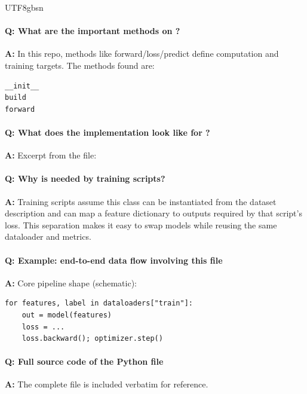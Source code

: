 \documentclass[11pt]{article}
\begin{document}
\begin{CJK*}{UTF8}{gbsn}
\paragraph{Q: What are the important methods on \texttt{}?}
\textbf{A:} In this repo, methods like forward/loss/predict define computation and training targets. The methods found are:

\begin{Verbatim}[fontsize=\small]
__init__
build
forward
\end{Verbatim}

\paragraph{Q: What does the implementation look like for \texttt{}?}
\textbf{A:} Excerpt from the file:

\vspace{1mm}


\paragraph{Q: Why is \texttt{} needed by training scripts?}
\textbf{A:} Training scripts assume this class can be instantiated from the dataset description and can map a feature dictionary to outputs required by that script's loss. This separation makes it easy to swap models while reusing the same dataloader and metrics.

\paragraph{Q: Example: end-to-end data flow involving this file}
\textbf{A:} Core pipeline shape (schematic):

\begin{Verbatim}[fontsize=\small]
for features, label in dataloaders["train"]:
    out = model(features)
    loss = ...
    loss.backward(); optimizer.step()
\end{Verbatim}

\paragraph{Q: Full source code of the Python file}
\textbf{A:} The complete file is included verbatim for reference.


\end{CJK*}
\end{document}
